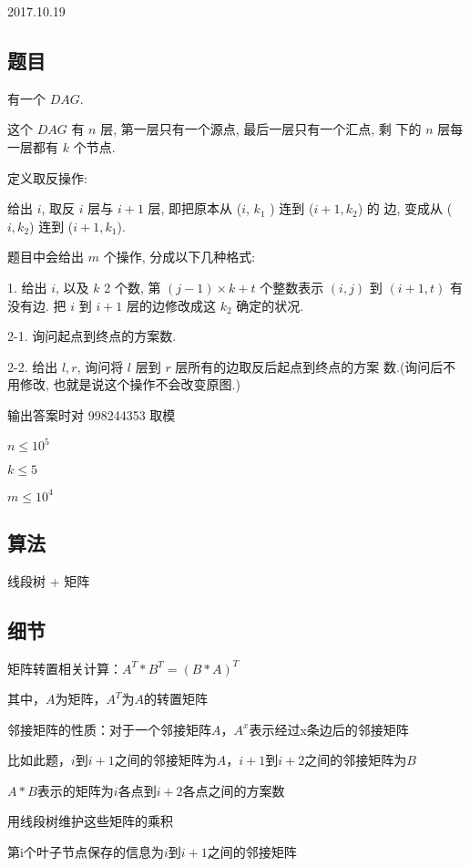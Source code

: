 \documentclass[a4paper]{article}
\begin{document}
		2017.10.19
		
	
	\subsection{题目}
	
		有一个 $DAG$.
		
		这个 $DAG$ 有 $n$ 层, 第一层只有一个源点, 最后一层只有一个汇点, 剩
		下的 $n$ 层每一层都有 $k$ 个节点.
		
		定义取反操作:
		
		给出 $i$, 取反 $i$ 层与 $i + 1$ 层, 即把原本从 ($i$, $k_1$ ) 连到 ($i + 1, k_2 $) 的	边,
		变成从 ($i, k_ 2$) 连到 ($i + 1, k_ 1 $).
		
		题目中会给出 $m$ 个操作, 分成以下几种格式:
		
		1. 给出 $i$, 以及 $k$ 2 个数, 第 $(j−1)×k + t$ 个整数表示 $(i, j)$ 到 $(i + 1, t)$
		有没有边. 把 $i$ 到 $i + 1$ 层的边修改成这 $k _2$ 确定的状况.
		
		2-1. 询问起点到终点的方案数.
		
		2-2. 给出 $l, r$, 询问将 $l$ 层到 $r$ 层所有的边取反后起点到终点的方案
		数.(询问后不用修改, 也就是说这个操作不会改变原图.)
		
		输出答案时对 998244353 取模
		
		$n \leq 10^5 $
		
		$k \leq 5 $
		
		$m \leq 10^4$
		
	\subsection{算法}
		
		线段树 + 矩阵
	
	\subsection{细节}
		
		矩阵转置相关计算：$A^T * B^T = (B * A)^T$
		
		其中，$A$为矩阵，$A^T$为$A$的转置矩阵
		
		邻接矩阵的性质：对于一个邻接矩阵$A$，$A^x$表示经过x条边后的邻接矩阵
		
		比如此题，$i$到$i+1$之间的邻接矩阵为$A$，$i+1$到$i+2$之间的邻接矩阵为$B$
		
		$A * B$表示的矩阵为$i$各点到$i+2$各点之间的方案数
		
		用线段树维护这些矩阵的乘积
		
		第i个叶子节点保存的信息为$i$到$i+1$之间的邻接矩阵
		
\end{document}
